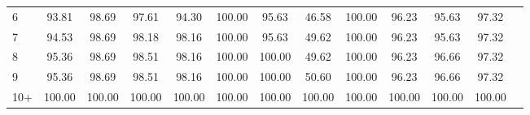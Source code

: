 \begin{tabular}{|l|c|c|c|c|c|c|c|c|c|c|c|c|}
6  & 93.81 & 98.69 & 97.61 & 94.30 & 100.00 & 95.63 & 46.58 & 100.00 & 96.23 & 95.63 & 97.32\\\cline{0-11}
7  & 94.53 & 98.69 & 98.18 & 98.16 & 100.00 & 95.63 & 49.62 & 100.00 & 96.23 & 95.63 & 97.32\\\cline{0-11}
8  & 95.36 & 98.69 & 98.51 & 98.16 & 100.00 & 100.00 & 49.62 & 100.00 & 96.23 & 96.66 & 97.32\\\cline{0-11}
9  & 95.36 & 98.69 & 98.51 & 98.16 & 100.00 & 100.00 & 50.60 & 100.00 & 96.23 & 96.66 & 97.32\\\cline{0-11}
10+ & 100.00 & 100.00 & 100.00 & 100.00 & 100.00 & 100.00 & 100.00 & 100.00 & 100.00 & 100.00 & 100.00\\\cline{0-11}\cline{0-11}
\end{tabular}
